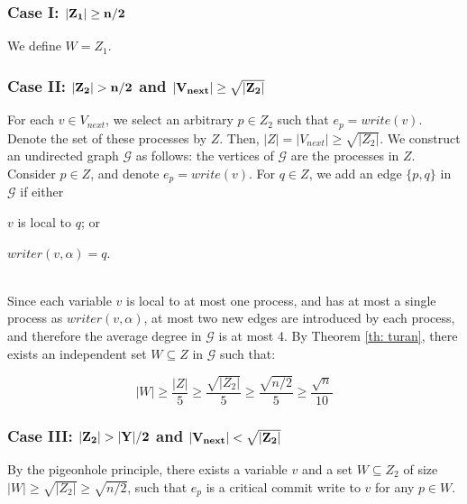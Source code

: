 \subsubsection*{\hspace{5mm} Case I: $\bf |Z_1| \geq n/2$}
We define $W = Z_1$.

\subsubsection*{\hspace{5mm} Case II: $\bf |Z_2| > n/2$ and $\bf |V_{next}| \geq \sqrt{|Z_2|}$}
For each $v \in V_{next}$, we select an arbitrary $p \in Z_2$ such that $e_p = write(v)$. Denote the set of these processes by $Z$. Then, $|Z|=|V_{next}| \geq \sqrt{|Z_2|}$.
\newline We construct an undirected graph $\mathcal{G}$ as follows: the vertices of $\mathcal{G}$ are the processes in $Z$. Consider $p \in Z$, and denote $e_p = write(v)$. For $q \in Z$, we add an edge $\{p,q\}$ in $\mathcal{G}$ if either
\begin{inparaenum}
	\item $v$ is local to $q$; or
	\item $writer(v,\alpha) = q$.
\end{inparaenum}
\\ Since each variable $v$ is local to at most one process, and has at most a single process as $writer(v,\alpha)$, at most two new edges are introduced by each process, and therefore the average degree in $\mathcal{G}$ is at most 4. By Theorem \ref{th: turan}, there exists an independent set $W \subseteq Z$ in $\mathcal{G}$ such that:

$$ |W| \geq \frac{|Z|}{5} \geq \frac{\sqrt{|Z_2|}}{5} \geq \frac{\sqrt{n/2}}{5} \geq \frac{\sqrt{n}}{10} $$

\subsubsection*{\hspace{5mm} Case III: $\bf |Z_2| > |Y|/2$ and $\bf |V_{next}| < \sqrt{|Z_2|}$}
By the pigeonhole principle, there exists a variable $v$ and a set $W \subseteq Z_2$ of size $|W| \geq \sqrt{|Z_2|} \geq \sqrt{n/2}$, such that $e_p$ is a critical commit write to $v$ for any $p \in W$.


